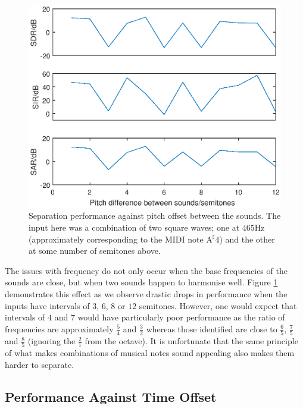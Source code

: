 \documentclass[12pt,a4paper,twoside,openright]{report}
\begin{document}
\begin{figure}
\centering
\includegraphics[width=0.7\linewidth]{./PitchPlot}
\caption[Separation performance against pitch offset between the sounds.]{Separation performance against pitch offset between the sounds. The input here was a combination of two square waves; one at $ 465 $Hz (approximately corresponding to the MIDI note $ \mathrm{A}^\sharp 4 $) and the other at some number of semitones above.}
\label{fig:PitchPlot}
\end{figure}

The issues with frequency do not only occur when the base frequencies of the sounds are close, but when two sounds happen to harmonise well. Figure \ref{fig:PitchPlot} demonstrates this effect as we observe drastic drops in performance when the inputs have intervals of $ 3 $, $ 6 $, $ 8 $ or $ 12 $ semitones. However, one would expect that intervals of $ 4 $ and $ 7 $ would have particularly poor performance as the ratio of frequencies are approximately $ \frac{5}{4} $ and $ \frac{3}{2} $ whereas those identified are close to $ \frac{6}{5} $, $ \frac{7}{5} $ and $ \frac{8}{5} $ (ignoring the $ \frac{2}{1} $ from the octave). It is unfortunate that the same principle of what makes combinations of musical notes sound appealing also makes them harder to separate.

\subsection{Performance Against Time Offset}

\end{document}
